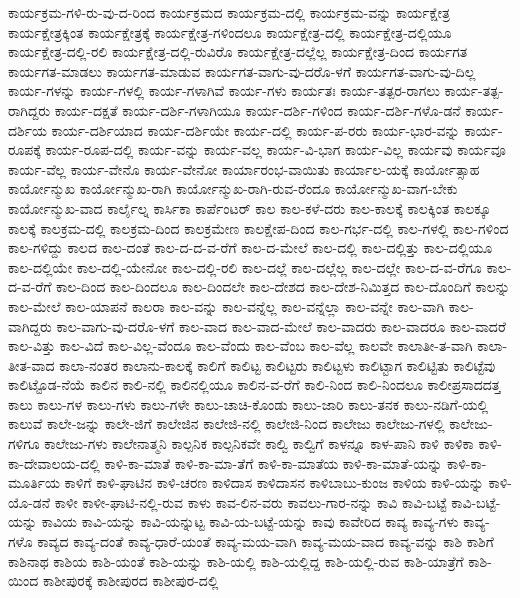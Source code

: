 {ಕಾರ್ಯಕ್ರಮ-ಗಳಿ-ರು-ವು-ದ-ರಿಂದ
ಕಾರ್ಯಕ್ರಮದ
ಕಾರ್ಯಕ್ರಮ-ದಲ್ಲಿ
ಕಾರ್ಯಕ್ರಮ-ವನ್ನು
ಕಾರ್ಯಕ್ಷೇತ್ರ
ಕಾರ್ಯಕ್ಷೇತ್ರಕ್ಕಿಂತ
ಕಾರ್ಯಕ್ಷೇತ್ರಕ್ಕೆ
ಕಾರ್ಯಕ್ಷೇತ್ರ-ಗಳಿಂದಲೂ
ಕಾರ್ಯಕ್ಷೇತ್ರ-ದಲ್ಲಿ
ಕಾರ್ಯಕ್ಷೇತ್ರ-ದಲ್ಲಿಯೂ
ಕಾರ್ಯಕ್ಷೇತ್ರ-ದಲ್ಲಿ-ರಲಿ
ಕಾರ್ಯಕ್ಷೇತ್ರ-ದಲ್ಲಿ-ರುವಿರೊ
ಕಾರ್ಯಕ್ಷೇತ್ರ-ದಲ್ಲೆಲ್ಲ
ಕಾರ್ಯಕ್ಷೇತ್ರ-ದಿಂದ
ಕಾರ್ಯಗತ
ಕಾರ್ಯಗತ-ಮಾಡಲು
ಕಾರ್ಯಗತ-ಮಾಡುವ
ಕಾರ್ಯಗತ-ವಾಗು-ವು-ದರೊ-ಳಗೆ
ಕಾರ್ಯಗತ-ವಾಗು-ವು-ದಿಲ್ಲ
ಕಾರ್ಯ-ಗಳನ್ನು
ಕಾರ್ಯ-ಗಳಲ್ಲಿ
ಕಾರ್ಯ-ಗಳಾಗಿವೆ
ಕಾರ್ಯ-ಗಳು
ಕಾರ್ಯತಃ
ಕಾರ್ಯ-ತತ್ಪರ-ರಾಗಲು
ಕಾರ್ಯ-ತತ್ಪ-ರಾಗಿದ್ದರು
ಕಾರ್ಯ-ದಕ್ಷತೆ
ಕಾರ್ಯ-ದರ್ಶಿ-ಗಳಾಗಿಯೂ
ಕಾರ್ಯ-ದರ್ಶಿ-ಗಳಿಂದ
ಕಾರ್ಯ-ದರ್ಶಿ-ಗಳೊ-ಡನೆ
ಕಾರ್ಯ-ದರ್ಶಿಯ
ಕಾರ್ಯ-ದರ್ಶಿಯಾದ
ಕಾರ್ಯ-ದರ್ಶಿಯೇ
ಕಾರ್ಯ-ದಲ್ಲಿ
ಕಾರ್ಯ-ಪ-ರರು
ಕಾರ್ಯ-ಭಾರ-ವನ್ನು
ಕಾರ್ಯ-ರೂಪಕ್ಕೆ
ಕಾರ್ಯ-ರೂಪ-ದಲ್ಲಿ
ಕಾರ್ಯ-ವನ್ನು
ಕಾರ್ಯ-ವಲ್ಲ
ಕಾರ್ಯ-ವಿ-ಭಾಗ
ಕಾರ್ಯ-ವಿಲ್ಲ
ಕಾರ್ಯವು
ಕಾರ್ಯವೂ
ಕಾರ್ಯ-ವೆಲ್ಲ
ಕಾರ್ಯ-ವೇನೊ
ಕಾರ್ಯ-ವೇನೋ
ಕಾರ್ಯಾರಂಭ-ವಾಯಿತು
ಕಾರ್ಯಾಲ-ಯಕ್ಕೆ
ಕಾರ್ಯೋತ್ಸಾಹ
ಕಾರ್ಯೋನ್ಮುಖ
ಕಾರ್ಯೋನ್ಮುಖ-ರಾಗಿ
ಕಾರ್ಯೋನ್ಮುಖ-ರಾಗಿ-ರುವ-ರೆಂದೂ
ಕಾರ್ಯೋನ್ಮುಖ-ವಾಗ-ಬೇಕು
ಕಾರ್ಯೋನ್ಮುಖ-ವಾದ
ಕಾರ್ಲೈಲ್ನ
ಕಾರ್ಸಿಕಾ
ಕಾರ್ಪೆಂಟರ್
ಕಾಲ
ಕಾಲ-ಕಳೆ-ದರು
ಕಾಲ-ಕಾಲಕ್ಕೆ
ಕಾಲಕ್ಕಿಂತ
ಕಾಲಕ್ಕೂ
ಕಾಲಕ್ಕೆ
ಕಾಲಕ್ರಮ-ದಲ್ಲಿ
ಕಾಲಕ್ರಮ-ದಿಂದ
ಕಾಲಕ್ರಮೇಣ
ಕಾಲಕ್ಷೇಪ-ದಿಂದ
ಕಾಲ-ಗರ್ಭ-ದಲ್ಲಿ
ಕಾಲ-ಗಳಲ್ಲಿ
ಕಾಲ-ಗಳಿಂದ
ಕಾಲ-ಗಳಿದ್ದು
ಕಾಲದ
ಕಾಲ-ದಂತೆ
ಕಾಲ-ದ-ದ-ವ-ರೆಗೆ
ಕಾಲ-ದ-ಮೇಲೆ
ಕಾಲ-ದಲ್ಲಿ
ಕಾಲ-ದಲ್ಲಿತ್ತು
ಕಾಲ-ದಲ್ಲಿಯೂ
ಕಾಲ-ದಲ್ಲಿಯೇ
ಕಾಲ-ದಲ್ಲಿ-ಯೇನೋ
ಕಾಲ-ದಲ್ಲಿ-ರಲಿ
ಕಾಲ-ದಲ್ಲೆ
ಕಾಲ-ದಲ್ಲೆಲ್ಲ
ಕಾಲ-ದಲ್ಲೇ
ಕಾಲ-ದ-ವ-ರೆಗೂ
ಕಾಲ-ದ-ವ-ರೆಗೆ
ಕಾಲ-ದಿಂದ
ಕಾಲ-ದಿಂದಲೂ
ಕಾಲ-ದಿಂದಲೇ
ಕಾಲ-ದೇಶದ
ಕಾಲ-ದೇಶ-ನಿಮಿತ್ತದ
ಕಾಲ-ದೊಂದಿಗೆ
ಕಾಲನ್ನು
ಕಾಲ-ಮೇಲೆ
ಕಾಲ-ಯಾಪನೆ
ಕಾಲರಾ
ಕಾಲ-ವನ್ನು
ಕಾಲ-ವನ್ನೆಲ್ಲ
ಕಾಲ-ವನ್ನೆಲ್ಲಾ
ಕಾಲ-ವನ್ನೇ
ಕಾಲ-ವಾಗಿ
ಕಾಲ-ವಾಗಿದ್ದರು
ಕಾಲ-ವಾಗು-ವು-ದರೊ-ಳಗೆ
ಕಾಲ-ವಾದ
ಕಾಲ-ವಾದ-ಮೇಲೆ
ಕಾಲ-ವಾದರು
ಕಾಲ-ವಾದರೂ
ಕಾಲ-ವಾದರೆ
ಕಾಲ-ವಿತ್ತು
ಕಾಲ-ವಿದೆ
ಕಾಲ-ವಿಲ್ಲ-ವೆಂದೂ
ಕಾಲ-ವೆಂದು
ಕಾಲ-ವೆಂಬ
ಕಾಲ-ವೆಲ್ಲ
ಕಾಲವೇ
ಕಾಲಾತೀ-ತ-ವಾಗಿ
ಕಾಲಾ-ತೀತ-ವಾದ
ಕಾಲಾ-ನಂತರ
ಕಾಲಾನು-ಕಾಲಕ್ಕೆ
ಕಾಲಿಗೆ
ಕಾಲಿಟ್ಟ
ಕಾಲಿಟ್ಟರು
ಕಾಲಿಟ್ಟಳು
ಕಾಲಿಟ್ಟಾಗ
ಕಾಲಿಟ್ಟಿತು
ಕಾಲಿಟ್ಟೆವು
ಕಾಲಿಟ್ಟೊಡ-ನೆಯೆ
ಕಾಲಿನ
ಕಾಲಿ-ನಲ್ಲಿ
ಕಾಲಿನಲ್ಲಿಯೂ
ಕಾಲಿನ-ವ-ರೆಗೆ
ಕಾಲಿ-ನಿಂದ
ಕಾಲಿ-ನಿಂದಲೂ
ಕಾಲೀಪ್ರಸಾದದತ್ತ
ಕಾಲು
ಕಾಲು-ಗಳ
ಕಾಲು-ಗಳು
ಕಾಲು-ಗಳೇ
ಕಾಲು-ಚಾಚಿ-ಕೊಂಡು
ಕಾಲು-ಜಾರಿ
ಕಾಲು-ತನಕ
ಕಾಲು-ನಡಿಗೆ-ಯಲ್ಲಿ
ಕಾಲುವೆ
ಕಾಲೇ-ಜನ್ನು
ಕಾಲೇ-ಜಿಗೆ
ಕಾಲೇಜಿನ
ಕಾಲೇಜಿ-ನಲ್ಲಿ
ಕಾಲೇಜಿ-ನಿಂದ
ಕಾಲೇಜು
ಕಾಲೇಜು-ಗಳಲ್ಲಿ
ಕಾಲೇಜು-ಗಳಿಗೂ
ಕಾಲೇಜು-ಗಳು
ಕಾಲೇನಾತ್ಮನಿ
ಕಾಲ್ಪನಿಕ
ಕಾಲ್ಪನಿಕವೇ
ಕಾಲ್ವಿ
ಕಾಲ್ವಿಗೆ
ಕಾಳನ್ನೂ
ಕಾಳ-ಪಾನಿ
ಕಾಳಿ
ಕಾಳಿಕಾ
ಕಾಳಿ-ಕಾ-ದೇವಾಲಯ-ದಲ್ಲಿ
ಕಾಳಿ-ಕಾ-ಮಾತೆ
ಕಾಳಿ-ಕಾ-ಮಾ-ತೆಗೆ
ಕಾಳಿ-ಕಾ-ಮಾತೆಯ
ಕಾಳಿ-ಕಾ-ಮಾತೆ-ಯನ್ನು
ಕಾಳಿ-ಕಾ-ಮೂರ್ತಿಯ
ಕಾಳಿಗೆ
ಕಾಳಿ-ಘಾಟಿನ
ಕಾಳಿ-ಚರಣ
ಕಾಳಿದಾಸ
ಕಾಳಿದಾಸನ
ಕಾಳಿಬಾಬು-ಕುಂಜ
ಕಾಳಿಯ
ಕಾಳಿ-ಯನ್ನು
ಕಾಳಿ-ಯೊ-ಡನೆ
ಕಾಳೀ
ಕಾಳೀ-ಘಾಟಿ-ನಲ್ಲಿ-ರುವ
ಕಾಳು
ಕಾವ-ಲಿನ-ವರು
ಕಾವಲು-ಗಾರ-ನನ್ನು
ಕಾವಿ
ಕಾವಿ-ಬಟ್ಟೆ
ಕಾವಿ-ಬಟ್ಟೆ-ಯನ್ನು
ಕಾವಿಯ
ಕಾವಿ-ಯನ್ನು
ಕಾವಿ-ಯನ್ನುಟ್ಟ
ಕಾವಿ-ಯ-ಬಟ್ಟೆ-ಯನ್ನು
ಕಾವು
ಕಾವೇರಿದ
ಕಾವ್ಯ
ಕಾವ್ಯ-ಗಳು
ಕಾವ್ಯ-ಗಳೊ
ಕಾವ್ಯದ
ಕಾವ್ಯ-ದಂತೆ
ಕಾವ್ಯ-ಧಾರೆ-ಯಂತೆ
ಕಾವ್ಯ-ಮಯ-ವಾಗಿ
ಕಾವ್ಯ-ಮಯ-ವಾದ
ಕಾವ್ಯ-ವನ್ನು
ಕಾಶಿ
ಕಾಶಿಗೆ
ಕಾಶಿನಾಥ
ಕಾಶಿಯ
ಕಾಶಿ-ಯಂತೆ
ಕಾಶಿ-ಯನ್ನು
ಕಾಶಿ-ಯಲ್ಲಿ
ಕಾಶಿ-ಯಲ್ಲಿದ್ದ
ಕಾಶಿ-ಯಲ್ಲಿ-ರುವ
ಕಾಶಿ-ಯಾತ್ರೆಗೆ
ಕಾಶಿ-ಯಿಂದ
ಕಾಶೀಪುರಕ್ಕೆ
ಕಾಶೀಪುರದ
ಕಾಶೀಪುರ-ದಲ್ಲಿ
}
